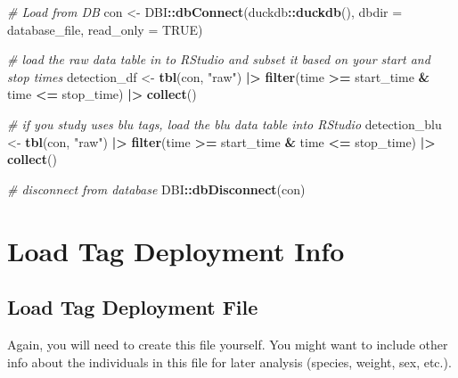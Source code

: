 \documentclass[
]{book}
\newenvironment{Shaded}{\begin{snugshade}}{\end{snugshade}}
\newcommand{\AttributeTok}[1]{\textcolor[rgb]{0.13,0.29,0.53}{#1}}
\newcommand{\CommentTok}[1]{\textcolor[rgb]{0.56,0.35,0.01}{\textit{#1}}}
\newcommand{\ConstantTok}[1]{\textcolor[rgb]{0.56,0.35,0.01}{#1}}
\newcommand{\FunctionTok}[1]{\textcolor[rgb]{0.13,0.29,0.53}{\textbf{#1}}}
\newcommand{\NormalTok}[1]{#1}
\newcommand{\OtherTok}[1]{\textcolor[rgb]{0.56,0.35,0.01}{#1}}
\newcommand{\SpecialCharTok}[1]{\textcolor[rgb]{0.81,0.36,0.00}{\textbf{#1}}}
\newcommand{\StringTok}[1]{\textcolor[rgb]{0.31,0.60,0.02}{#1}}
\begin{document}
\begin{Shaded}
\begin{Highlighting}[]
\CommentTok{\# Load from DB}
\NormalTok{con }\OtherTok{\textless{}{-}}\NormalTok{ DBI}\SpecialCharTok{::}\FunctionTok{dbConnect}\NormalTok{(duckdb}\SpecialCharTok{::}\FunctionTok{duckdb}\NormalTok{(), }
                      \AttributeTok{dbdir =}\NormalTok{ database\_file, }
                      \AttributeTok{read\_only =} \ConstantTok{TRUE}\NormalTok{)}

\CommentTok{\# load the raw data table in to RStudio and subset it based on your start and stop times}
\NormalTok{detection\_df }\OtherTok{\textless{}{-}} \FunctionTok{tbl}\NormalTok{(con, }\StringTok{"raw"}\NormalTok{) }\SpecialCharTok{|\textgreater{}} 
  \FunctionTok{filter}\NormalTok{(time }\SpecialCharTok{\textgreater{}=}\NormalTok{ start\_time }\SpecialCharTok{\&}\NormalTok{ time }\SpecialCharTok{\textless{}=}\NormalTok{ stop\_time) }\SpecialCharTok{|\textgreater{}}
  \FunctionTok{collect}\NormalTok{()}

\CommentTok{\# if you study uses blu tags, load the blu data table into RStudio}
\NormalTok{detection\_blu }\OtherTok{\textless{}{-}} \FunctionTok{tbl}\NormalTok{(con, }\StringTok{"raw"}\NormalTok{) }\SpecialCharTok{|\textgreater{}} 
  \FunctionTok{filter}\NormalTok{(time }\SpecialCharTok{\textgreater{}=}\NormalTok{ start\_time }\SpecialCharTok{\&}\NormalTok{ time }\SpecialCharTok{\textless{}=}\NormalTok{ stop\_time) }\SpecialCharTok{|\textgreater{}}
  \FunctionTok{collect}\NormalTok{()}

\CommentTok{\# disconnect from database}
\NormalTok{DBI}\SpecialCharTok{::}\FunctionTok{dbDisconnect}\NormalTok{(con)}
\end{Highlighting}
\end{Shaded}

\section{Load Tag Deployment Info}\label{load-tag-deployment-info}

\subsection{Load Tag Deployment File}\label{load-tag-deployment-file}

Again, you will need to create this file yourself. You might want to include other info about the individuals in this file for later analysis (species, weight, sex, etc.).
\end{document}
